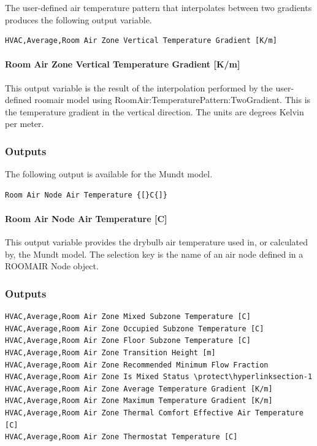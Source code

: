 The user-defined air temperature pattern that interpolates between two gradients produces the following output variable.

\begin{lstlisting}
HVAC,Average,Room Air Zone Vertical Temperature Gradient [K/m]
\end{lstlisting}

\paragraph{Room Air Zone Vertical Temperature Gradient {[}K/m{]}}\label{room-air-zone-vertical-temperature-gradient-km}

This output variable is the result of the interpolation performed by the user-defined roomair model using RoomAir:TemperaturePattern:TwoGradient. This is the temperature gradient in the vertical direction. The units are degrees Kelvin per meter.

\subsubsection{Outputs}\label{outputs-3-017}

The following output is available for the Mundt model.

\begin{lstlisting}
Room Air Node Air Temperature {[}C{]}
\end{lstlisting}

\paragraph{Room Air Node Air Temperature {[}C{]}}\label{room-air-node-air-temperature-c}

This output variable provides the drybulb air temperature used in, or calculated by, the Mundt model. The selection key is the name of an air node defined in a ROOMAIR Node object.

\subsubsection{Outputs}\label{outputs-4-014}

\begin{lstlisting}
HVAC,Average,Room Air Zone Mixed Subzone Temperature [C]
HVAC,Average,Room Air Zone Occupied Subzone Temperature [C]
HVAC,Average,Room Air Zone Floor Subzone Temperature [C]
HVAC,Average,Room Air Zone Transition Height [m]
HVAC,Average,Room Air Zone Recommended Minimum Flow Fraction
HVAC,Average,Room Air Zone Is Mixed Status \protect\hyperlinksection-1
HVAC,Average,Room Air Zone Average Temperature Gradient [K/m]
HVAC,Average,Room Air Zone Maximum Temperature Gradient [K/m]
HVAC,Average,Room Air Zone Thermal Comfort Effective Air Temperature [C]
HVAC,Average,Room Air Zone Thermostat Temperature [C]
\end{lstlisting}

